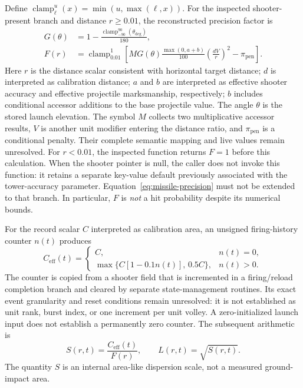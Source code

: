 \documentclass[11pt]{article}
\begin{document}
Define $\operatorname{clamp}_{\ell}^{u}(x)=\min(u,\max(\ell,x))$.
For the inspected shooter-present branch and distance $r\geq0.01$, the
reconstructed precision factor is
\begin{align}
  G(\theta)&=1-\frac{\operatorname{clamp}_{-90}^{90}
                         (\theta_{\mathrm{deg}})}{180},\\
  F(r)&=\operatorname{clamp}_{0.01}^{1}\!\left[
    M G(\theta)\frac{\max(0,a+b)}{100}
    \left(\frac{dV}{r}\right)^2-\pi_{\mathrm{pen}}
  \right].
  \label{eq:missile-precision}
\end{align}
Here $r$ is the distance scalar consistent with horizontal target distance;
$d$ is interpreted as calibration distance; $a$ and $b$ are interpreted as
effective shooter accuracy and effective projectile marksmanship, respectively;
$b$ includes conditional accessor additions to the base projectile value.
The angle $\theta$ is the stored launch elevation.  The symbol $M$ collects two multiplicative
accessor results, $V$ is another unit modifier entering the distance ratio,
and $\pi_{\mathrm{pen}}$ is a conditional penalty.  Their complete semantic
mapping and live values remain unresolved.  For $r<0.01$, the inspected
function returns $F=1$ before this calculation.  When the shooter pointer
is null, the caller does not invoke this function: it retains a separate
key-value default previously associated with the tower-accuracy parameter.
Equation~\ref{eq:missile-precision} must not be extended to that branch.
In particular, $F$ is
\emph{not} a hit probability despite its numerical bounds.

For the record scalar $C$ interpreted as calibration area, an unsigned
firing-history counter $n(t)$ produces
\begin{equation}
  C_{\mathrm{eff}}(t)=
  \begin{cases}
    C, & n(t)=0,\\
    \max\{C[1-0.1n(t)],\,0.5C\}, & n(t)>0.
  \end{cases}
\end{equation}
The counter is copied from a shooter field that is incremented in a
firing/reload completion branch and cleared by separate state-management
routines.  Its exact event granularity and reset conditions remain unresolved:
it is not established as unit rank, burst index, or one increment per unit
volley.  A zero-initialized launch input does not establish a permanently zero
counter.  The subsequent arithmetic is
\begin{equation}
  S(r,t)=\frac{C_{\mathrm{eff}}(t)}{F(r)},\qquad L(r,t)=\sqrt{S(r,t)}.
  \label{eq:missile-calibration-scale}
\end{equation}
The quantity $S$ is an internal area-like dispersion scale, not a measured
ground-impact area.
\end{document}
